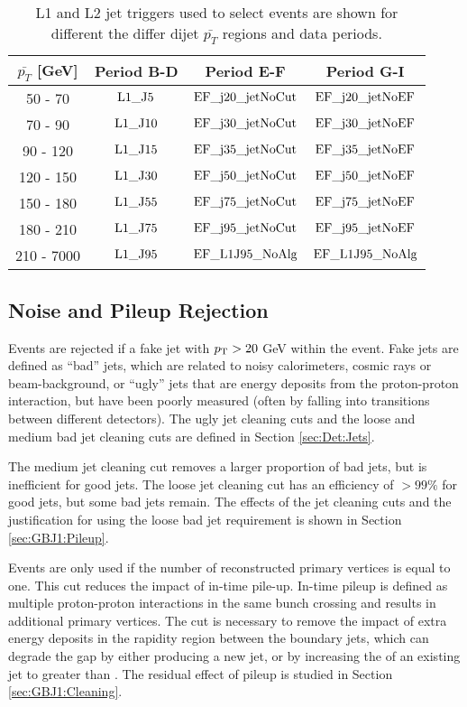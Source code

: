 \begin{table}[htdp]
\centering
\begin{tabular}{ | c | c | c | c | }
  \hline                       
 $\bar{p_T}$ [GeV] & Period B-D & Period E-F & Period G-I \\
  \hline                       
50 - 70   & $\rm L1\_J5$  & $\rm EF\_j20\_jetNoCut$ & $\rm EF\_j20\_jetNoEF$ \\
70 - 90   & $\rm L1\_J10$ & $\rm EF\_j30\_jetNoCut$ & $\rm EF\_j30\_jetNoEF$ \\
90 - 120  & $\rm L1\_J15$ & $\rm EF\_j35\_jetNoCut$ & $\rm EF\_j35\_jetNoEF$ \\
120 - 150  & $\rm L1\_J30$ & $\rm EF\_j50\_jetNoCut$ & $\rm EF\_j50\_jetNoEF$ \\
150 - 180  & $\rm L1\_J55$ & $\rm EF\_j75\_jetNoCut$ & $\rm EF\_j75\_jetNoEF$ \\
180 - 210  & $\rm L1\_J75$ & $\rm EF\_j95\_jetNoCut$ & $\rm EF\_j95\_jetNoEF$ \\ 
210 - 7000  & $\rm L1\_J95$ & $\rm EF\_L1J95\_NoAlg$  & $\rm EF\_L1J95\_NoAlg$ \\
  \hline                       
\end{tabular}
\caption[Trigger strategy using jet triggers]{
L1 and L2 jet triggers used to select events are shown for different the differ dijet $\bar{p_T}$ regions and data periods. 
\label{tab:trig_strat}}
\end{table}%

\subsection{Noise and Pileup Rejection}

Events are rejected if a fake jet with $\mbox{$p_{\rm T}$}{}>20$ GeV within the event.
Fake jets are defined as ``bad'' jets, which are related to noisy calorimeters, cosmic rays or beam-background, or ``ugly'' jets that are energy deposits from the proton-proton interaction, but have been poorly measured (often by falling into transitions between different detectors). 
The ugly jet cleaning cuts and the loose and medium bad jet cleaning cuts are defined in Section \ref{sec:Det:Jets}.

The medium jet cleaning cut removes a larger proportion of bad jets, but is inefficient for good jets.
The loose jet cleaning cut has an efficiency of $>99\%$ for good jets, but some bad jets remain.
The effects of the jet cleaning cuts and the justification for using the loose bad jet requirement is shown in Section \ref{sec:GBJ1:Pileup}.


Events are only used if the number of reconstructed primary vertices is equal to one.
This cut reduces the impact of in-time pile-up. 
In-time pileup is defined as multiple proton-proton interactions in the same bunch crossing and results in additional primary vertices.
The cut is necessary to remove the impact of extra energy deposits in the rapidity region between the boundary jets, which can degrade the gap by either producing a new jet, or by increasing the \pt{} of an existing jet to greater than \qz{}.
The residual effect of pileup is studied in Section \ref{sec:GBJ1:Cleaning}. 

